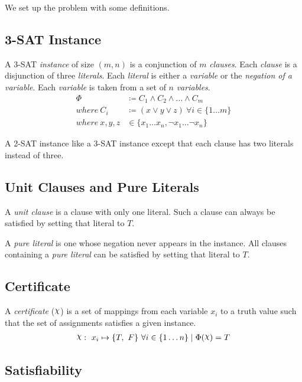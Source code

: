 We set up the problem with some definitions.


\subsection{3-SAT Instance}
\label{subsec:3-sat-instance}

A 3-SAT \textit{instance} of size $(m, n)$ is a conjunction of $m$ \textit{clauses}.
Each \textit{clause} is a disjunction of three \textit{literals}.
Each \textit{literal} is either a \textit{variable} or the \textit{negation of a variable}.
Each \textit{variable} is taken from a set of $n$ \textit{variables}.
\begin{align*}
    \Phi & \coloneqq C_1 \land C_2 \land \ldots \land C_m \\
    where~ C_i & \coloneqq (x \lor y \lor z)~ \forall i \in \{ 1 \ldots m \} \\
    where~ x, y, z & \in \{ x_1 \ldots x_n, \lnot x_1 \ldots \lnot x_n \}
\end{align*}

A 2-SAT instance like a 3-SAT instance except that each clause has two literals instead of three.


\subsection{Unit Clauses and Pure Literals}
\label{subsec:unit-clauses-and-pure-literals}

A \textit{unit clause} is a clause with only one literal.
Such a clause can always be satisfied by setting that literal to $T$.

A \textit{pure literal} is one whose negation never appears in the instance.
All clauses containing a \textit{pure literal} can be satisfied by setting that literal to $T$.


\subsection{Certificate}
\label{subsec:certificate}

A \textit{certificate} ($\rchi$) is a set of mappings from each variable $x_i$ to a truth value such that the set of assignments satisfies a given instance.
\begin{align*}
    \rchi :~ x_i \mapsto \{ T,~ F \}~ \forall i \in \{ 1 \ldots n \}
    \mid \Phi(\rchi) = T
\end{align*}


\subsection{Satisfiability}
\label{subsec:satisfiability}

